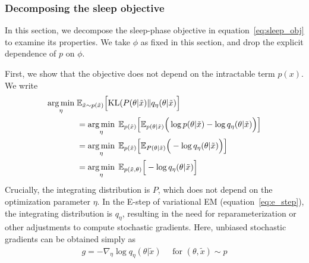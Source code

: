 
\subsubsection{Decomposing the sleep objective}
\label{sec:sleep_details}
In this section, we decompose the sleep-phase objective in equation~\eqref{eq:sleep_obj} to examine its properties. 
We take $\phi$ as fixed in this section, and drop the explicit dependence of $p$ on $\phi$.

First, we show that the objective does not depend on the intractable term $p(x)$. 
We write
\begin{align}
 \operatorname*{arg\,min}_{\eta} \; & \mathbb{E}_{\tilde x \sim p(\tilde x)}\Big[ \mathrm{KL}(P(\theta | \tilde x) \| q_\eta(\theta | \tilde x)\Big] \\
  &=\operatorname*{arg\,min}_{\eta} \; \mathbb E_{p(\tilde x)}\Big[\mathbb E_{p(\theta | \tilde x)}\Big(\log p(\theta | \tilde x) - \log q_\eta(\theta | \tilde x) \Big)\Big]\\
&=\operatorname*{arg\,min}_{\eta} \; \mathbb E_{p(\tilde x)}\Big[\mathbb E_{P(\theta | \tilde x)}\Big( - \log q_\eta(\theta | \tilde x) \Big)\Big]\\
&=\operatorname*{arg\,min}_{\eta} \; \mathbb E_{p(\tilde x, \theta)}\Big[- \log q_\eta(\theta | \tilde x) \Big]\label{eq:sleep_loss_simple}
\end{align}
Crucially, the integrating distribution is $P$, which does not depend on the optimization parameter $\eta$.
In the E-step of variational EM (equation~\eqref{eq:e_step}), the integrating distribution is $q_\eta$, resulting in the need for reparameterization or other adjustments to compute stochastic gradients. 
Here, unbiased stochastic gradients can be obtained simply as 
\begin{align}
    g = -\nabla_\eta \log q_\eta(\theta | \tilde x) \quad \text{ for } (\theta, \tilde x)\sim p
\end{align}

